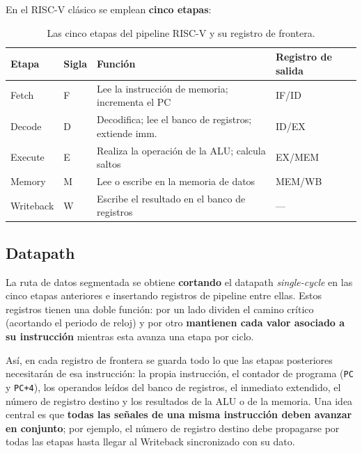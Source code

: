 \documentclass[11pt,a4paper]{article}
\begin{document}
En el RISC-V clásico se emplean \textbf{cinco etapas}:

\begin{table}[ht]
	\centering
	\begin{tabular}{@{}llll@{}}
		\toprule
		\textbf{Etapa} & \textbf{Sigla} & \textbf{Función}                                     & \textbf{Registro de salida} \\
		\midrule
		Fetch          & F              & Lee la instrucción de memoria; incrementa el PC      & IF/ID                       \\
		Decode         & D              & Decodifica; lee el banco de registros; extiende imm. & ID/EX                       \\
		Execute        & E              & Realiza la operación de la ALU; calcula saltos       & EX/MEM                      \\
		Memory         & M              & Lee o escribe en la memoria de datos                 & MEM/WB                      \\
		Writeback      & W              & Escribe el resultado en el banco de registros        & ---                         \\
		\bottomrule
	\end{tabular}
	\caption{Las cinco etapas del pipeline RISC-V y su registro de frontera.}
\end{table}

\subsection{Datapath}

La ruta de datos segmentada se obtiene \textbf{cortando} el datapath
\textit{single-cycle} en las cinco etapas anteriores e insertando registros de
pipeline entre ellas. Estos registros tienen una doble función: por un lado dividen
el camino crítico (acortando el periodo de reloj) y por otro \textbf{mantienen cada
	valor asociado a su instrucción} mientras esta avanza una etapa por ciclo.

Así, en cada registro de frontera se guarda todo lo que las etapas posteriores
necesitarán de esa instrucción: la propia instrucción, el contador de programa
(\texttt{PC} y \texttt{PC+4}), los operandos leídos del banco de registros, el
inmediato extendido, el número de registro destino y los resultados de la ALU o de la
memoria. Una idea central es que \textbf{todas las señales de una misma instrucción
	deben avanzar en conjunto}; por ejemplo, el número de registro destino debe
propagarse por todas las etapas hasta llegar al Writeback sincronizado con su dato.
\end{document}
